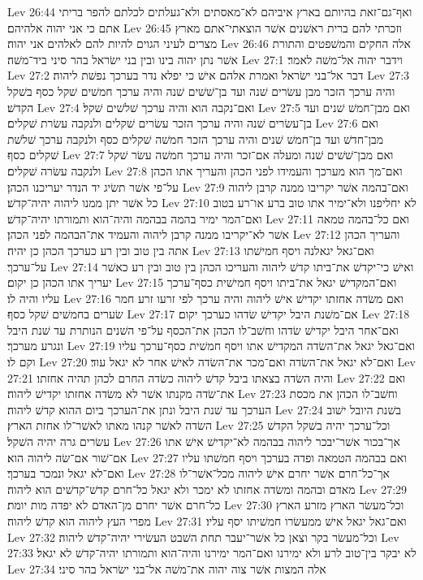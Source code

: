 Lev 26:44  ואף־גם־זאת בהיותם בארץ איביהם לא־מאסתים ולא־געלתים לכלתם להפר בריתי אתם כי אני יהוה אלהיהם׃
Lev 26:45  וזכרתי להם ברית ראשׁנים אשׁר הוצאתי־אתם מארץ מצרים לעיני הגוים להיות להם לאלהים אני יהוה׃
Lev 26:46  אלה החקים והמשׁפטים והתורת אשׁר נתן יהוה בינו ובין בני ישׂראל בהר סיני ביד־משׁה׃
Lev 27:1  וידבר יהוה אל־משׁה לאמר׃
Lev 27:2  דבר אל־בני ישׂראל ואמרת אלהם אישׁ כי יפלא נדר בערכך נפשׁת ליהוה׃
Lev 27:3  והיה ערכך הזכר מבן עשׂרים שׁנה ועד בן־שׁשׁים שׁנה והיה ערכך חמשׁים שׁקל כסף בשׁקל הקדשׁ׃
Lev 27:4  ואם־נקבה הוא והיה ערכך שׁלשׁים שׁקל׃
Lev 27:5  ואם מבן־חמשׁ שׁנים ועד בן־עשׂרים שׁנה והיה ערכך הזכר עשׂרים שׁקלים ולנקבה עשׂרת שׁקלים׃
Lev 27:6  ואם מבן־חדשׁ ועד בן־חמשׁ שׁנים והיה ערכך הזכר חמשׁה שׁקלים כסף ולנקבה ערכך שׁלשׁת שׁקלים כסף׃
Lev 27:7  ואם מבן־שׁשׁים שׁנה ומעלה אם־זכר והיה ערכך חמשׁה עשׂר שׁקל ולנקבה עשׂרה שׁקלים׃
Lev 27:8  ואם־מך הוא מערכך והעמידו לפני הכהן והעריך אתו הכהן על־פי אשׁר תשׂיג יד הנדר יעריכנו הכהן׃
Lev 27:9  ואם־בהמה אשׁר יקריבו ממנה קרבן ליהוה כל אשׁר יתן ממנו ליהוה יהיה־קדשׁ׃
Lev 27:10  לא יחליפנו ולא־ימיר אתו טוב ברע או־רע בטוב ואם־המר ימיר בהמה בבהמה והיה־הוא ותמורתו יהיה־קדשׁ׃
Lev 27:11  ואם כל־בהמה טמאה אשׁר לא־יקריבו ממנה קרבן ליהוה והעמיד את־הבהמה לפני הכהן׃
Lev 27:12  והעריך הכהן אתה בין טוב ובין רע כערכך הכהן כן יהיה׃
Lev 27:13  ואם־גאל יגאלנה ויסף חמישׁתו על־ערכך׃
Lev 27:14  ואישׁ כי־יקדשׁ את־ביתו קדשׁ ליהוה והעריכו הכהן בין טוב ובין רע כאשׁר יעריך אתו הכהן כן יקום׃
Lev 27:15  ואם־המקדישׁ יגאל את־ביתו ויסף חמישׁית כסף־ערכך עליו והיה לו׃
Lev 27:16  ואם משׂדה אחזתו יקדישׁ אישׁ ליהוה והיה ערכך לפי זרעו זרע חמר שׂערים בחמשׁים שׁקל כסף׃
Lev 27:17  אם־משׁנת היבל יקדישׁ שׂדהו כערכך יקום׃
Lev 27:18  ואם־אחר היבל יקדישׁ שׂדהו וחשׁב־לו הכהן את־הכסף על־פי השׁנים הנותרת עד שׁנת היבל ונגרע מערכך׃
Lev 27:19  ואם־גאל יגאל את־השׂדה המקדישׁ אתו ויסף חמשׁית כסף־ערכך עליו וקם לו׃
Lev 27:20  ואם־לא יגאל את־השׂדה ואם־מכר את־השׂדה לאישׁ אחר לא יגאל עוד׃
Lev 27:21  והיה השׂדה בצאתו ביבל קדשׁ ליהוה כשׂדה החרם לכהן תהיה אחזתו׃
Lev 27:22  ואם את־שׂדה מקנתו אשׁר לא משׂדה אחזתו יקדישׁ ליהוה׃
Lev 27:23  וחשׁב־לו הכהן את מכסת הערכך עד שׁנת היבל ונתן את־הערכך ביום ההוא קדשׁ ליהוה׃
Lev 27:24  בשׁנת היובל ישׁוב השׂדה לאשׁר קנהו מאתו לאשׁר־לו אחזת הארץ׃
Lev 27:25  וכל־ערכך יהיה בשׁקל הקדשׁ עשׂרים גרה יהיה השׁקל׃
Lev 27:26  אך־בכור אשׁר־יבכר ליהוה בבהמה לא־יקדישׁ אישׁ אתו אם־שׁור אם־שׂה ליהוה הוא׃
Lev 27:27  ואם בבהמה הטמאה ופדה בערכך ויסף חמשׁתו עליו ואם־לא יגאל ונמכר בערכך׃
Lev 27:28  אך־כל־חרם אשׁר יחרם אישׁ ליהוה מכל־אשׁר־לו מאדם ובהמה ומשׂדה אחזתו לא ימכר ולא יגאל כל־חרם קדשׁ־קדשׁים הוא ליהוה׃
Lev 27:29  כל־חרם אשׁר יחרם מן־האדם לא יפדה מות יומת׃
Lev 27:30  וכל־מעשׂר הארץ מזרע הארץ מפרי העץ ליהוה הוא קדשׁ ליהוה׃
Lev 27:31  ואם־גאל יגאל אישׁ ממעשׂרו חמשׁיתו יסף עליו׃
Lev 27:32  וכל־מעשׂר בקר וצאן כל אשׁר־יעבר תחת השׁבט העשׂירי יהיה־קדשׁ ליהוה׃
Lev 27:33  לא יבקר בין־טוב לרע ולא ימירנו ואם־המר ימירנו והיה־הוא ותמורתו יהיה־קדשׁ לא יגאל׃
Lev 27:34  אלה המצות אשׁר צוה יהוה את־משׁה אל־בני ישׂראל בהר סיני׃


